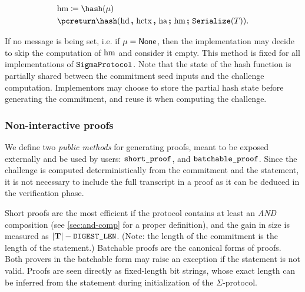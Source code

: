 \documentclass[11pt]{article}
\begin{document}
  \[
    \begin{aligned}
     & \hmsg \defeq \hash(\msg) \\
    & \pcreturn  \hash(\hd \concat \hctx \concat \hstatement \concatblock \hmsg \concatblock  \serialize(\commitment)).
    \end{aligned}
  \]

If no message is being set, i.e. if $\mu = \mathsf{None}$, then the implementation may decide to skip the computation of $\text{hm}$ and consider it empty.
This method is fixed for all implementations of $\texttt{SigmaProtocol}$. Note that the state of the hash function is partially shared between the commitment seed inputs and the challenge computation. Implementors may choose to store the partial hash state before generating the commitment, and reuse it when computing the challenge.






\subsubsection{Non-interactive proofs}

We define two \emph{public methods} for generating proofs, meant to be exposed externally and be used by users: $\texttt{short\_proof}$, and $\texttt{batchable\_proof}$.
Since the challenge is computed deterministically from the commitment and the statement, it is not necessary to include the full transcript in a proof as it can be deduced in the verification phase.

Short proofs are the most efficient if the protocol contains at least an \emph{AND} composition (see \cref{sec:and-comp} for a proper definition), and the gain in size is measured as $|\mathbf {T}| - \texttt{DIGEST\_LEN}$.
(Note: the length of the commitment is the length of the statement.)
Batchable proofs are the canonical forms of proofs.
Both provers in the batchable form may raise an exception if the statement is not valid.
Proofs are seen directly as fixed-length bit strings, whose exact length can be inferred from the statement during initialization of the $\Sigma$-protocol.
\end{document}
